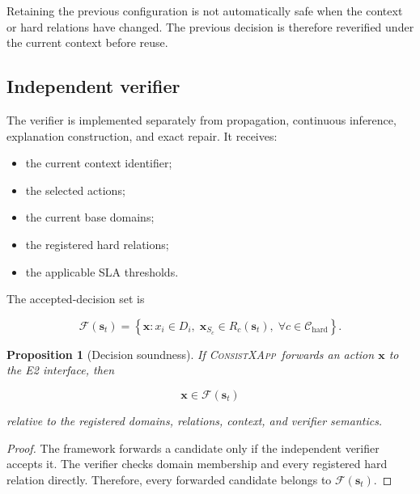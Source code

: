 \documentclass[pdflatex,sn-mathphys-num,iicol,oneside]{sn-jnl}
\newcommand{\method}{\textsc{ConsistXApp}}
\newtheorem{proposition}{Proposition}
\begin{document}
Retaining the previous configuration is not automatically safe when
the context or hard relations have changed. The previous decision is
therefore reverified under the current context before reuse.

\subsection{Independent verifier}

The verifier is implemented separately from propagation, continuous
inference, explanation construction, and exact repair. It receives:

\begin{itemize}
    \item the current context identifier;
    \item the selected actions;
    \item the current base domains;
    \item the registered hard relations;
    \item the applicable SLA thresholds.
\end{itemize}

The accepted-decision set is

\begin{equation}
\mathcal{F}(\bm{s}_t)
=
\left\{
\bm{x}:
x_i\in D_i,
\;
\bm{x}_{S_c}\in R_c(\bm{s}_t),
\;
\forall c\in\mathcal{C}_{\mathrm{hard}}
\right\}.
\label{eq:feasible-set}
\end{equation}

\begin{proposition}[Decision soundness]
If \method\ forwards an action $\bm{x}$ to the E2 interface, then

\begin{equation}
\bm{x}\in\mathcal{F}(\bm{s}_t)
\end{equation}

relative to the registered domains, relations, context, and verifier
semantics.
\end{proposition}

\begin{proof}
The framework forwards a candidate only if the independent verifier
accepts it. The verifier checks domain membership and every
registered hard relation directly. Therefore, every forwarded
candidate belongs to $\mathcal{F}(\bm{s}_t)$.
\end{proof}
\end{document}
